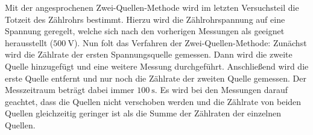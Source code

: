 Mit der angesprochenen Zwei-Quellen-Methode wird im letzten Versuchsteil die Totzeit
des Zählrohrs bestimmt. Hierzu wird die Zählrohrspannung auf eine Spannung geregelt, 
welche sich nach den vorherigen Messungen als geeignet herausstellt ($\SI{500}{\volt}$).
Nun folt das Verfahren der Zwei-Quellen-Methode: Zunächst wird die Zählrate der ersten
Spannungsquelle gemessen. Dann wird die zweite Quelle hinzugefügt und eine weitere 
Messung durchgeführt. Anschließend wird die erste Quelle entfernt und nur noch die 
Zählrate der zweiten Quelle gemessen. Der Messzeitraum beträgt dabei immer $\SI{100}{\second}$.
Es wird bei den Messungen darauf geachtet, dass die Quellen nicht verschoben 
werden und die Zählrate von beiden Quellen gleichzeitig geringer ist als die Summe 
der Zählraten der einzelnen Quellen. \\